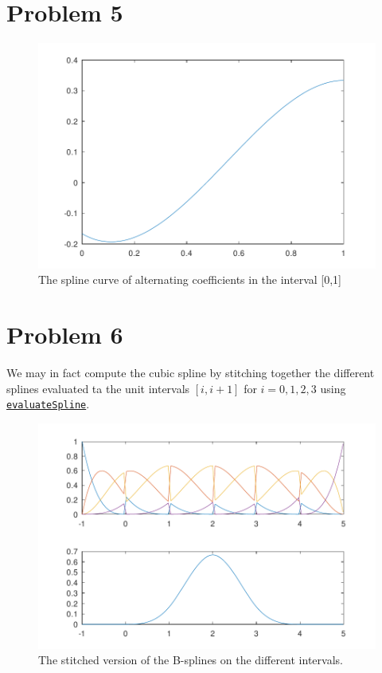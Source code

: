 \documentclass{article}
\begin{document}
\section*{Problem 5}




\begin{figure}
    \centering
    \includegraphics[width=\linewidth]{figures/plotSplineCurve.pdf}
    \caption{The spline curve of alternating coefficients in the interval [0,1]}
\end{figure}

\section*{Problem 6}

We may in fact compute the cubic spline by stitching together the different splines
evaluated ta the unit intervals $[i,i + 1]$ for $i=0,1,2,3$ using \hyperref[alg:evaluateSpline]{\texttt{evaluateSpline}}.


\begin{figure}
    \centering
    \includegraphics[width=\linewidth]{figures/plotWholeCubic.pdf}
    \caption{The stitched version of the B-splines on the different intervals.}
\end{figure}
\end{document}
